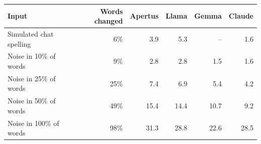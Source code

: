\begin{tabular}{lrrrrr}
\toprule
Input & Words changed & Apertus & Llama & Gemma & Claude \\
\midrule
Simulated chat spelling & 6\% & 3.9 & 5.3 & -- & 1.6 \\
Noise in 10\% of words & 9\% & 2.8 & 2.8 & 1.5 & 1.6 \\
Noise in 25\% of words & 25\% & 7.4 & 6.9 & 5.4 & 4.2 \\
Noise in 50\% of words & 49\% & 15.4 & 14.4 & 10.7 & 9.2 \\
Noise in 100\% of words & 98\% & 31.3 & 28.8 & 22.6 & 28.5 \\
\bottomrule
\end{tabular}
